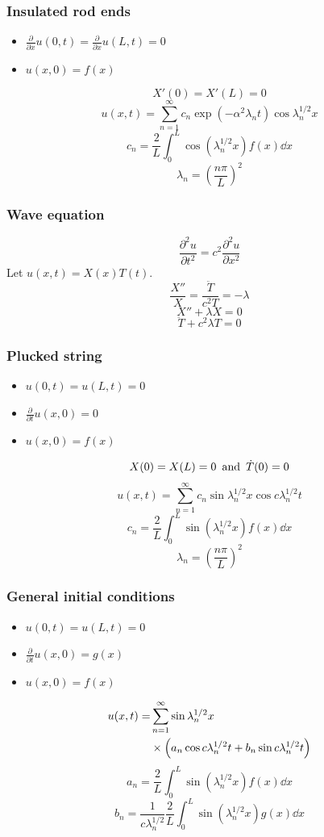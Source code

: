\documentclass{article}
\begin{document}
\begin{multicols}{3}
\subsubsection*{Insulated rod ends}
\begin{itemize}
    \item $\displaystyle\frac{\partial}{\partial x}u(0,t)
    =\displaystyle\frac{\partial}{\partial x}u(L,t)=0$
    \item $u(x,0)=f(x)$
\end{itemize}
$$X'(0)=X'(L)=0$$
$$u(x,t)=\sum_{n=1}^{\infty}c_n\exp(-\alpha^2\lambda_n t)
\cos\lambda_n^{1/2}x$$
$$c_n=\frac{2}{L}\int_{0}^{L}
\cos(\lambda_n^{1/2}x) f(x)\dd x$$
$$\lambda_n=\left(\frac{n\pi}{L}\right)^2$$

\subsubsection*{Wave equation}
$$\frac{\partial^2u}{\partial t^2}=c^2\frac{\partial^2u}{\partial x^2}$$
Let $u(x,t)=X(x)T(t)$.
$$\frac{X''}{X}=\frac{\ddot{T}}{c^2 T}=-\lambda$$
$$X''+\lambda X=0$$
$$\ddot{T}+c^2\lambda T=0$$

\subsubsection*{Plucked string}
\begin{itemize}
    \item $u(0,t)=u(L,t)=0$
    \item $\displaystyle\frac{\partial}{\partial t}
    u(x,0)=0$
    \item $u(x,0)=f(x)$
\end{itemize}
$$X(0)=X(L)=0
\hspace{0.07in}\text{and}\hspace{0.07in}
\dot{T}(0)=0$$
$$u(x,t)=\sum_{n=1}^{\infty}c_n\sin\lambda_n^{1/2}x
\cos c\lambda_n^{1/2}t$$
$$c_n=\frac{2}{L}\int_{0}^{L}
\sin(\lambda_n^{1/2}x) f(x)\dd x$$
$$\lambda_n=\left(\frac{n\pi}{L}\right)^2$$

\subsubsection*{General initial conditions}
\begin{itemize}
    \item $u(0,t)=u(L,t)=0$
    \item $\displaystyle\frac{\partial}{\partial t}
    u(x,0)=g(x)$
    \item $u(x,0)=f(x)$
\end{itemize}
\begin{align*}
    u(x,t)=&\sum_{n=1}^{\infty}\sin\lambda_n^{1/2}x \\
    &\times\Bigl(a_n\cos c\lambda_n^{1/2}t
    +b_n\sin c\lambda_n^{1/2}t\Bigr)
\end{align*}
$$a_n=\frac{2}{L}\int_{0}^{L}
\sin(\lambda_n^{1/2}x)f(x)\dd x$$
$$b_n=\frac{1}{c\lambda_n^{1/2}}\frac{2}{L}
\int_{0}^{L}\sin(\lambda_n^{1/2}x)g(x)\dd x$$


\end{multicols}
\end{document}
